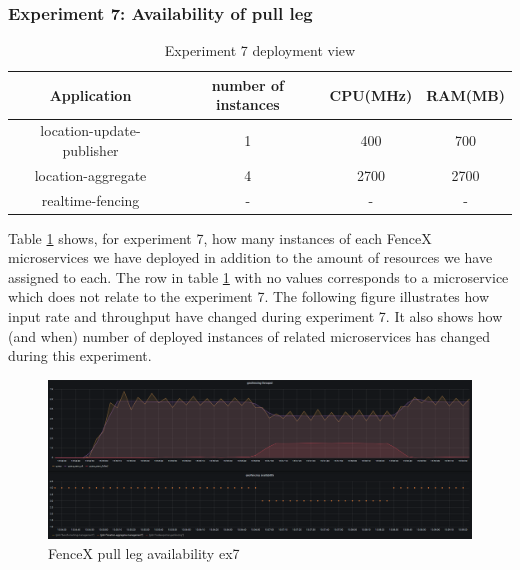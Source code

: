 \documentclass[a4]{report}
\begin{document}
    \subsubsection{Experiment 7: Availability of pull leg}
    \begin{table}[h!]
        \centering
        \begin{tabular}{|c|c|c|c|}
            \hline
            Application               & number of instances & CPU(MHz) & RAM(MB) \\
            \hline
            location-update-publisher & 1                   & 400      & 700     \\
            location-aggregate        & 4                   & 2700     & 2700    \\
            realtime-fencing          & -                   & -        & -       \\
            \hline
        \end{tabular}
        \caption{Experiment 7 deployment view}
        \label{table:ex7-dv}
    \end{table}

    Table \ref{table:ex7-dv} shows, for experiment 7, how many instances of each FenceX microservices we have
    deployed in addition to the amount of resources we have assigned to each.
    The row in table \ref{table:ex7-dv} with no values corresponds to a microservice which does not relate to the
    experiment 7.
    The following figure illustrates how input rate and throughput have changed during experiment 7.
    It also shows how (and when) number of deployed instances of related microservices has changed during this
    experiment.

    \begin{figure}
        \caption{FenceX pull leg availability ex7}
        \label{fig:ex7}
        \includegraphics[scale=0.5]{images/evaluation/ex7-benchmarking-ongoing-2per10sec.png}
    \end{figure}
\end{document}
